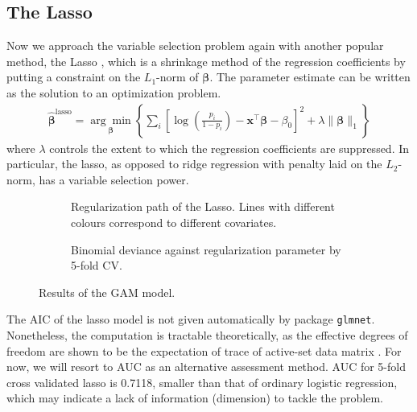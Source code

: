\subsection{The Lasso}
Now we approach the variable selection problem again with another popular method, the Lasso \cite{Friedman:2001:ESL}, which is a shrinkage method of the regression coefficients by putting a constraint on the $L_1$-norm of $\boldsymbol{\beta}$. The parameter estimate can be written as the solution to an optimization problem.
\begin{align}
\widehat{\boldsymbol{\beta}}^{\text{lasso}}=\underset{\boldsymbol{\beta}}{\arg\min}\left\{\sum_i\left[\log\left(\frac{p_i}{1-p_i}\right)-\mathbf{x}^\top\boldsymbol{\beta}-\beta_0\right]^2+\lambda\|\boldsymbol{\beta}\|_1\right\}
\end{align}
where $\lambda$ controls the extent to which the regression coefficients are suppressed. In particular, the lasso, as opposed to ridge regression with penalty laid on the $L_2$-norm, has a variable selection power.

\begin{figure}[htpb]
  \centering
    \begin{subfigure}{.5\textwidth} \centering
    \resizebox{\textwidth}{!}{%
	}
	\caption{Regularization path of the Lasso. Lines with different colours correspond to different covariates.}
    \end{subfigure}%
    \begin{subfigure}{.5\textwidth} \centering
	\resizebox{\textwidth}{!}{%
	    }
	\caption{Binomial deviance against regularization parameter by 5-fold CV.}
    \end{subfigure}
    \caption{Results of the GAM model.}
\end{figure}

\par The AIC of the lasso model is not given automatically by package \texttt{glmnet}. Nonetheless, the computation is tractable theoretically, as the effective degrees of freedom are shown to be the expectation of trace of active-set data matrix \cite{tibshirani:2012:dflasso}. For now, we will resort to AUC as an alternative assessment method. AUC for 5-fold cross validated lasso is 0.7118, smaller than that of ordinary logistic regression, which may indicate a lack of information (dimension) to tackle the problem.


